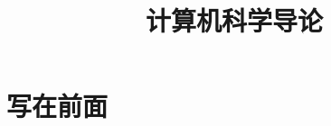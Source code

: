 \documentclass[oneside,a4paper]{book}
\title{计算机科学导论}
\begin{document}
\frontmatter
\maketitle
\chapter{写在前面}

\tableofcontents

\mainmatter








%
%
%
%
\end{document}
